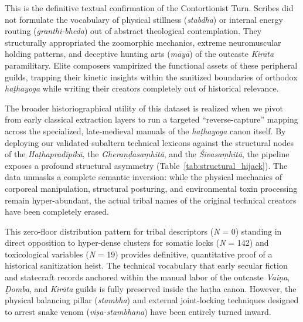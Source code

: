 \documentclass[11pt,twoside,letterpaper]{article}
\begin{document}
This is the definitive textual confirmation of the Contortionist Turn. Scribes did not formulate the vocabulary of physical stillness (\textit{stabdha}) or internal energy routing (\textit{granthi-bheda}) out of abstract theological contemplation. They structurally appropriated the zoomorphic mechanics, extreme neuromuscular holding patterns, and deceptive hunting arts (\textit{māyā}) of the outcaste \textit{Kirāta} paramilitary. Elite composers vampirized the functional assets of these peripheral guilds, trapping their kinetic insights within the sanitized boundaries of orthodox \textit{haṭhayoga} while writing their creators completely out of historical relevance.

The broader historiographical utility of this dataset is realized when we pivot from early classical extraction layers to run a targeted ``reverse-capture'' mapping across the specialized, late-medieval manuals of the \textit{haṭhayoga} canon itself. By deploying our validated subaltern technical lexicons against the structural nodes of the \textit{Haṭhapradīpikā}, the \textit{Gheraṇḍasaṃhitā}, and the \textit{Śivasaṃhitā}, the pipeline exposes a profound structural asymmetry (Table~\ref{tab:structural_hijack}). The data unmasks a complete semantic inversion: while the physical mechanics of corporeal manipulation, structural posturing, and environmental toxin processing remain hyper-abundant, the actual tribal names of the original technical creators have been completely erased.

\begin{table}[ht]

\caption{The Structural Hijack Matrix: Semantic Frequencies in Hatha Manuals}
\label{tab:structural_hijack}
\end{table}

This zero-floor distribution pattern for tribal descriptors (\textit{N} = 0) standing in direct opposition to hyper-dense clusters for somatic locks (\textit{N} = 142) and toxicological variables (\textit{N} = 19) provides definitive, quantitative proof of a historical sanitization heist. The technical vocabulary that early secular fiction and statecraft records anchored within the manual labor of the outcaste \textit{Vaiṇa}, \textit{Ḍomba}, and \textit{Kirāta} guilds is fully preserved inside the haṭha canon. However, the physical balancing pillar (\textit{stambha}) and external joint-locking techniques designed to arrest snake venom (\textit{viṣa-stambhana}) have been entirely turned inward. 
\end{document}

